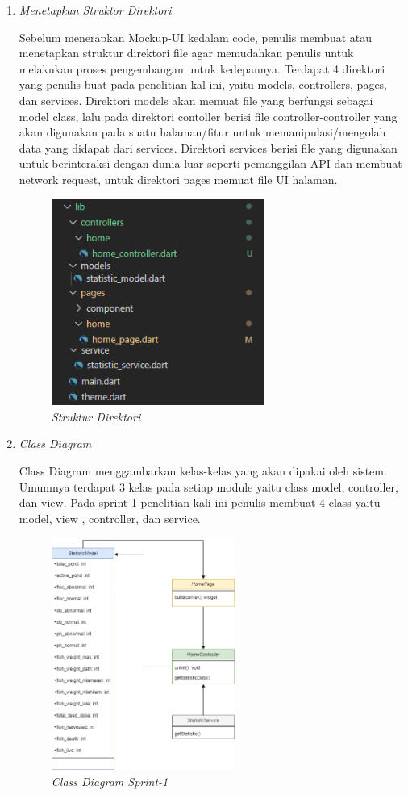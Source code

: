 \begin{enumerate}[listparindent=2em]
	\item{\textit{Menetapkan Struktor Direktori}}

	Sebelum menerapkan Mockup-UI kedalam code, penulis membuat atau menetapkan struktur direktori file agar memudahkan penulis untuk melakukan proses pengembangan untuk kedepannya. Terdapat 4 direktori yang penulis buat pada penelitian kal ini, yaitu models, controllers, pages, dan services. Direktori models akan memuat file yang berfungsi sebagai model class, lalu pada direktori contoller berisi file controller-controller yang akan digunakan pada suatu halaman/fitur untuk memanipulasi/mengolah data yang didapat dari services. Direktori services berisi file yang digunakan untuk berinteraksi dengan dunia luar seperti pemanggilan API dan membuat network request, untuk direktori pages memuat file UI halaman.

	\begin{figure}[H]
	\centering
	\includegraphics[keepaspectratio, width=7cm]{gambar/homedirektori}
	\caption{\textit{Struktur Direktori}}
	\label{gambar:homedirektori}
	\end{figure}

	\item{\textit{Class Diagram}}
	
	Class Diagram menggambarkan kelas-kelas yang akan dipakai oleh sistem. Umumnya terdapat 3 kelas pada setiap module yaitu class model, controller, dan view. Pada sprint-1 penelitian kali ini penulis membuat 4 class yaitu model, view , controller, dan service.
	 
	\begin{figure}[H]
	\centering
	\includegraphics[keepaspectratio, width=6cm]{gambar/CDfishnew}
	\caption{\textit{Class Diagram Sprint-1}}
	\label{gambar:classdiagram}
	\end{figure}


\end{enumerate}
